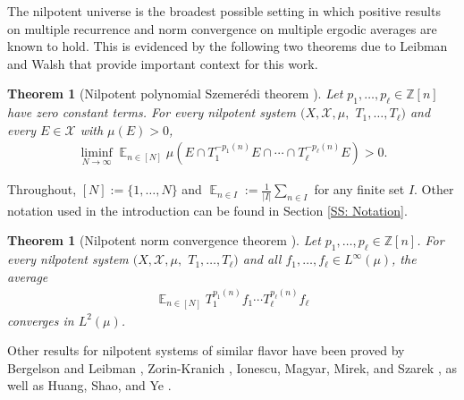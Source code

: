 \documentclass[11pt]{amsart}
\newtheorem{theorem}[lemma]{Theorem}
\theoremstyle{definition}
\DeclareMathOperator*{\E}{\mathbb{E}}
\newcommand{\N}{{\mathbb N}}
\newcommand{\Z}{{\mathbb Z}}
\newcommand{\CX}{{\mathcal X}}
\newcommand{\1}{{\mathbf{1}}}
\begin{document}
The nilpotent universe is the broadest possible setting in which positive results on multiple recurrence and norm convergence on multiple ergodic averages are known to hold. This is evidenced by the following two theorems due to Leibman and Walsh that provide important context for this work. 
\begin{theorem}[Nilpotent polynomial Szemer\'edi theorem {\cite{L98}}]\label{T: Leibman nilpotent}
    Let $p_1, \ldots, p_\ell\in\Z[n]$ have zero constant terms. For every nilpotent system $(X, \CX, \mu,$\! $T_1, \ldots, T_\ell)$ and every $E\in\CX$ with $\mu(E)>0$, %
    \begin{align*}
        \liminf_{N\to\infty}\E_{n\in[N]}
        \mu(E\cap T_1^{-p_1(n)}E\cap \cdots \cap T_\ell^{-p_\ell(n)}E)>0.
    \end{align*}
\end{theorem}
Throughout, $[N]:=\{1, \ldots, N\}$ and $\E_{n\in I} := \frac{1}{|I|}\sum_{n\in I}$ for any finite set $I$. Other notation used in the introduction can be found in Section \ref{SS: Notation}.
\begin{theorem}[Nilpotent norm convergence theorem {\cite{W12}}]\label{T: Walsh}
    Let $p_1, \ldots, p_\ell\in\Z[n]$. For every nilpotent system $(X, \CX, \mu,$\! $T_1, \ldots, T_\ell)$ and all $f_1, \ldots, f_\ell\in L^\infty(\mu)$, the average
    \begin{align}\label{E: Walsh's average}
        \E_{n\in[N]}T_1^{p_1(n)}f_1\cdots T_\ell^{p_\ell(n)}f_\ell
    \end{align}
    converges in $L^2(\mu)$.
\end{theorem}
Other results for nilpotent systems of similar flavor have been proved by Bergelson and Leibman \cite{BL02, BL03}, Zorin-Kranich \cite{ZK14, ZK16}, Ionescu, Magyar, Mirek, and Szarek \cite{IMMS23}, as well as Huang, Shao, and Ye \cite{HSY19}.
\end{document}
